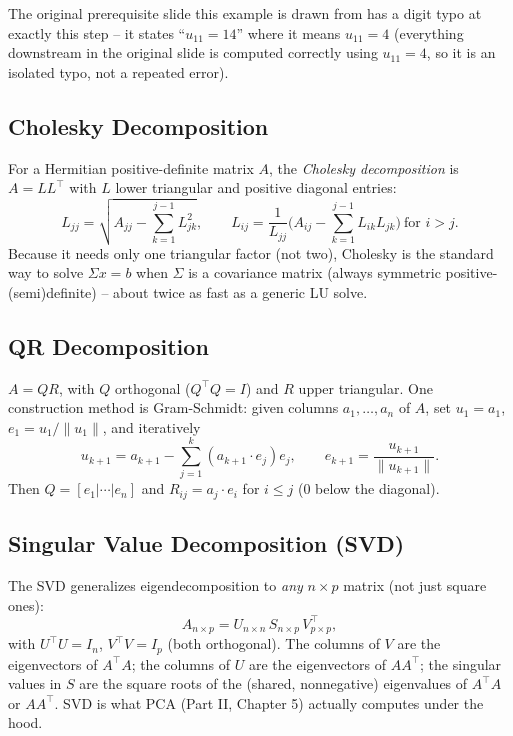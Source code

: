 \documentclass[11pt]{article}
\begin{document}
\begin{editorialnote}
The original prerequisite slide this example is drawn from has a digit
typo at exactly this step -- it states ``$u_{11} = 14$'' where it means
$u_{11} = 4$ (everything downstream in the original slide is computed
correctly using $u_{11}=4$, so it is an isolated typo, not a repeated
error).
\end{editorialnote}

\subsection{Cholesky Decomposition}
For a Hermitian positive-definite matrix $A$, the \emph{Cholesky
decomposition} is $A = LL^\top$ with $L$ lower triangular and positive
diagonal entries:
\[
  L_{jj} = \sqrt{A_{jj} - \sum_{k=1}^{j-1} L_{jk}^2}, \qquad
  L_{ij} = \frac{1}{L_{jj}}\Big(A_{ij} - \sum_{k=1}^{j-1} L_{ik}L_{jk}\Big)
  \ \text{for } i > j.
\]
Because it needs only one triangular factor (not two), Cholesky is the
standard way to solve $\Sigma x = b$ when $\Sigma$ is a covariance matrix
(always symmetric positive-(semi)definite) -- about twice as fast as a
generic LU solve.

\subsection{QR Decomposition}
$A = QR$, with $Q$ orthogonal ($Q^\top Q = I$) and $R$ upper triangular.
One construction method is Gram-Schmidt: given columns $a_1,\dots,a_n$ of
$A$, set $u_1 = a_1$, $e_1 = u_1/\lVert u_1\rVert$, and iteratively
\[
  u_{k+1} = a_{k+1} - \sum_{j=1}^{k}(a_{k+1}\cdot e_j)e_j, \qquad
  e_{k+1} = \frac{u_{k+1}}{\lVert u_{k+1}\rVert}.
\]
Then $Q = [e_1|\cdots|e_n]$ and $R_{ij} = a_j \cdot e_i$ for $i \le j$
(0 below the diagonal).

\subsection{Singular Value Decomposition (SVD)}
The SVD generalizes eigendecomposition to \emph{any} $n\times p$ matrix
(not just square ones):
\[
  A_{n\times p} = U_{n\times n}\, S_{n\times p}\, V_{p\times p}^\top,
\]
with $U^\top U = I_n$, $V^\top V = I_p$ (both orthogonal). The columns of
$V$ are the eigenvectors of $A^\top A$; the columns of $U$ are the
eigenvectors of $AA^\top$; the singular values in $S$ are the square
roots of the (shared, nonnegative) eigenvalues of $A^\top A$ or $AA^\top$.
SVD is what PCA (Part II, Chapter 5) actually computes under the hood.
\end{document}
